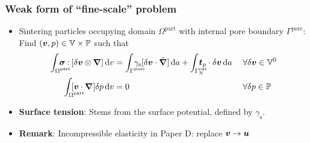\documentclass[11pt]{beamer} %
\newcommand{\external}{\mathrm{ext}}
\newcommand{\surf}{\mathrm{s}}
\newcommand{\pore}{\mathrm{pore}}
\newcommand{\particle}{\mathrm{part}}
\renewcommand{\alert}[1]{\textbf{#1}}
\begin{document}
\begin{frame}
 \frametitle{Weak form of ``fine-scale'' problem}
 \begin{itemize}
  \item Sintering particles occupying domain $\Omega^\particle$ with internal pore boundary $\Gamma^\pore$:
Find $(\boldsymbol{v},p)\in \mathbb{V} \times \mathbb{P}$ such that
\begin{align*}
  \int_{\mathrlap{\Omega^\particle}} \;\ts\sigma\dprod[\delta\ta v\outerp\ta\nabla]\dif v &=
   \int_{\mathrlap{\Gamma^\pore}} \;\gamma_\surf[\delta\ta v\cdot\hat{\ta\nabla}] \dif a +
    \int_{\mathrlap{\Gamma_\Neumann^\external}} \;\ta t_p\cdot\delta\ta v\dif a \; && \forall \delta \ta v\in \set V^0\\
  \int_{\mathrlap{\Omega^\particle}} \;[\ta v\cdot\ta\nabla]\delta p\dif v &= 0 && \forall \delta p\in \set P
\end{align*}

 \item \alert{Surface tension}: Stems from the surface potential, defined by $\gamma_\surf$.
 \item \alert{Remark}: Incompressible elasticity in Paper D: replace $\boldsymbol{v} \to \boldsymbol{u}$
 \end{itemize}
\end{frame}
\end{document}

